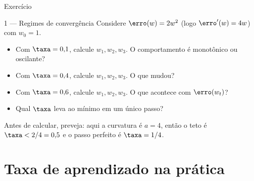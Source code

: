\documentclass[aspectratio=169, 11pt]{beamer}
\begin{document}
\begin{frame}{Exercício}
  \begin{exbox}{1 — Regimes de convergência}
    Considere \(\erro(w) = 2w^2\) (logo \(\erro'(w) = 4w\)) com \(w_0 = 1\).
    \begin{itemize}\setlength{\itemsep}{0.2ex}
      \item[(a)] Com \(\taxa = 0{,}1\), calcule \(w_1, w_2, w_3\). O
                 comportamento é monotônico ou oscilante?
      \item[(b)] Com \(\taxa = 0{,}4\), calcule \(w_1, w_2, w_3\). O que mudou?
      \item[(c)] Com \(\taxa = 0{,}6\), calcule \(w_1, w_2, w_3\). O que acontece
                 com \(\erro(w_t)\)?
      \item[(d)] Qual \(\taxa\) leva ao mínimo em um único passo?
    \end{itemize}
  \end{exbox}

  \begin{ideiabox}
    Antes de calcular, preveja: aqui a curvatura é \(a = 4\), então o teto é
    \(\taxa < 2/4 = 0{,}5\) e o passo perfeito é \(\taxa = 1/4\).
  \end{ideiabox}
\end{frame}

\section{Taxa de aprendizado na prática}
\end{document}
